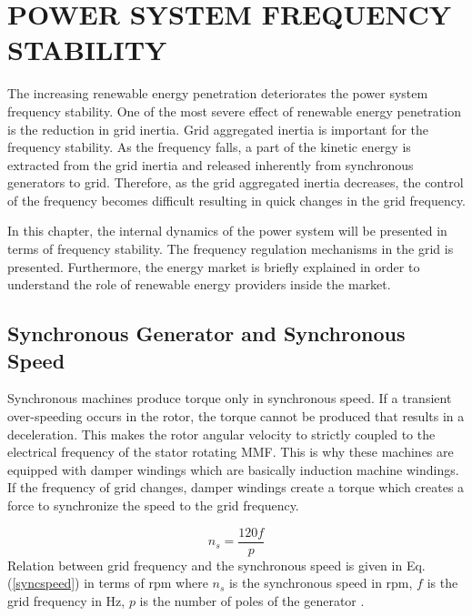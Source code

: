 \chapter{POWER SYSTEM FREQUENCY STABILITY}
\label{chp:2}
The increasing renewable energy penetration deteriorates the power system frequency stability. One of the most severe effect of renewable energy penetration is the reduction in grid inertia. Grid aggregated inertia is important for the frequency stability. As the frequency falls, a part of the kinetic energy is extracted from the grid inertia and released inherently from synchronous generators to grid. Therefore, as the grid aggregated inertia decreases, the control of the frequency becomes difficult resulting in quick changes in the grid frequency.\par
In this chapter, the internal dynamics of the power system will be presented in terms of frequency stability. The frequency regulation mechanisms in the grid is presented. Furthermore, the energy market is briefly explained in order to understand the role of renewable energy providers inside the market.
\section{Synchronous Generator and Synchronous Speed}
Synchronous machines produce torque only in synchronous speed. If a transient over-speeding occurs in the rotor, the torque cannot be produced that results in a deceleration. This makes the rotor angular velocity to strictly coupled to the electrical frequency  of the stator rotating MMF. This is why these machines are equipped with damper windings which are basically induction machine windings. If the frequency of  grid changes, damper windings create a torque which creates a force to synchronize the speed to the grid frequency. \par
\begin{equation}
n_{s}=\frac{120f}{p}
\label{syncspeed}
\end{equation}
Relation between grid frequency and the synchronous speed is given in Eq. (\ref{syncspeed}) in terms of rpm where $n_{s}$ is the synchronous speed in rpm, $f$ is the grid frequency in Hz, $p$ is the number of poles of the generator \cite{Kundur}.

